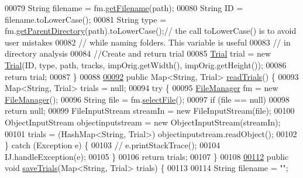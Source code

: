 \begin{DoxyCode}
00079     String filename = fm.\hyperlink{classfunctions_1_1_file_manager_ad027758f34214960a7aa800e0f7c19db}{getFilename}(path);
00080     String ID = filename.toLowerCase();
00081     String type = fm.\hyperlink{classfunctions_1_1_file_manager_aa9e15d838c5a7a0e3906d9ceec253398}{getParentDirectory}(path).toLowerCase();\textcolor{comment}{// the call toLowerCase() is
       to avoid user mistakes}
00082                                                                     \textcolor{comment}{// while naming folders. This variable
       is useful }
00083                                                                     \textcolor{comment}{// in directory analysis}
00084     \textcolor{comment}{//Create and return trial}
00085     \hyperlink{classdata_1_1_trial}{Trial} trial =  \textcolor{keyword}{new} \hyperlink{classdata_1_1_trial}{Trial}(ID, type, path, tracks, impOrig.getWidth(), impOrig.getHeight());
00086     \textcolor{keywordflow}{return} trial;
00087   \}
00088   
\hypertarget{_trial_manager_8java_source_l00092}{}\hyperlink{classfunctions_1_1_trial_manager_a53eafc0dad05f232ab8f7fc85fb214be}{00092}   \textcolor{keyword}{public} Map<String, Trial> \hyperlink{classfunctions_1_1_trial_manager_a53eafc0dad05f232ab8f7fc85fb214be}{readTrials}() \{
00093     Map<String, Trial> trials = null;
00094     \textcolor{keywordflow}{try} \{
00095       \hyperlink{classfunctions_1_1_file_manager}{FileManager} fm = \textcolor{keyword}{new} \hyperlink{classfunctions_1_1_file_manager}{FileManager}();
00096       String file = fm.\hyperlink{classfunctions_1_1_file_manager_aa741a9e7ac4127ae1a463fb626474edf}{selectFile}();
00097       \textcolor{keywordflow}{if} (file == null)
00098         \textcolor{keywordflow}{return} null;
00099       FileInputStream streamIn = \textcolor{keyword}{new} FileInputStream(file);
00100       ObjectInputStream objectinputstream = \textcolor{keyword}{new} ObjectInputStream(streamIn);
00101       trials = (HashMap<String, Trial>) objectinputstream.readObject();
00102     \} \textcolor{keywordflow}{catch} (Exception e) \{
00103 \textcolor{comment}{//      e.printStackTrace();}
00104       IJ.handleException(e);
00105     \}
00106     \textcolor{keywordflow}{return} trials;
00107   \} 
00108 
\hypertarget{_trial_manager_8java_source_l00112}{}\hyperlink{classfunctions_1_1_trial_manager_a8642d53e2fcedb9821fa9a91eb84e31f}{00112}   \textcolor{keyword}{public} \textcolor{keywordtype}{void} \hyperlink{classfunctions_1_1_trial_manager_a8642d53e2fcedb9821fa9a91eb84e31f}{saveTrials}(Map<String, Trial> trials) \{
00113 
00114     String filename = \textcolor{stringliteral}{""};

\end{DoxyCode}

